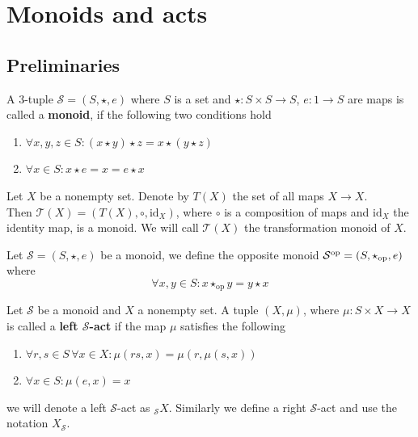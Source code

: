 \iffalse
\clearpage
\section{Monoids and acts}
\subsection{Preliminaries}
    \begin{definition}
        A 3-tuple $\mathcal{S} = (S,\star,e)$ where $S$ is a set and $\star : S\times S \to S$, $e : 1 \to S$ are 
        maps is called a \textbf{monoid}, if the following two conditions hold
        \begin{enumerate}
            \item $\forall x,y,z\in S : (x\star y)\star z = x\star(y\star z)$
            \item $\forall x\in S : x\star e = x = e \star x$
        \end{enumerate}
    \end{definition}
    \begin{example}
        Let $X$ be a nonempty set. Denote by $T(X)$ the set of all maps
        $X\to X$.\\ Then $\mathcal{T}(X) = (T(X),\circ,\text{id}_X) $, where $\circ$ is a 
        composition of maps and $\text{id}_X$ the identity map, is a monoid. We will
        call $\mathcal{T}(X)$ the transformation monoid of $X$.\par
        Let $\mathcal{S} = (S,\star,e)$ be a monoid, we define the opposite monoid $\mathcal{S}^{\text{op}}=(S,\star_{\text{op}}, e)$ where
        \[\forall x,y\in S: x\star_{\text{op}} y = y\star x\]
    \end{example}
    \begin{definition}
        Let $\mathcal{S}$ be a monoid and $X$ a nonempty set. A tuple $(X,\mu)$, where $\mu : S\times X \to X$ is called 
        a \textbf{left $\mathcal{S}$-act} if the map $\mu$ satisfies the following
        \begin{enumerate}
            \item $\forall r,s \in S\,\forall x \in X : \mu(rs, x) = \mu(r,\mu(s,x))$
            \item $\forall x \in S : \mu(e,x) = x$
        \end{enumerate}
        we will denote a left $\mathcal{S}$-act as ${}_{\mathcal{S}}X$. Similarly we
        define a right $\mathcal{S}$-act and use the notation $X_\mathcal{S}$.
    \end{definition}
